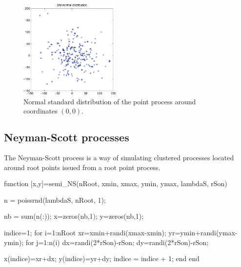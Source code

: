 \begin{figure}[htbp]
 \centering
 \includegraphics[width=5cm]{stdnormalprocess.pdf}
 \caption{Normal standard distribution of the point process around coordinates $(0,0)$.}
 \label{fig:matlab:spatialpp:npp}
\end{figure}


\subsection{Neyman-Scott processes}
The Neyman-Scott process is a way of simulating clustered processes located around root points issued from a root point process.

\begin{matlab}
function [x,y]=semi_NS(nRoot, xmin, xmax, ymin, ymax, lambdaS, rSon)

n = poissrnd(lambdaS, nRoot, 1);

nb = sum(n(:));
x=zeros(nb,1);
y=zeros(nb,1);

indice=1;
for i=1:nRoot
    xr=xmin+randi(xmax-xmin); %
    yr=ymin+randi(ymax-ymin);
    for j=1:n(i)
        dx=randi(2*rSon)-rSon;
        dy=randi(2*rSon)-rSon;
        
        x(indice)=xr+dx;
        y(indice)=yr+dy;
        indice = indice + 1;
    end
end
\end{matlab}

